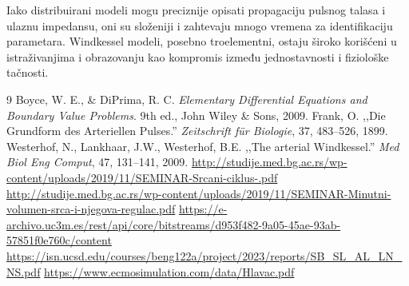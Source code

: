 \documentclass[12pt,a4paper]{article}
\begin{document}
Iako distribuirani modeli mogu preciznije opisati propagaciju pulsnog talasa i ulaznu impedansu, oni su složeniji i zahtevaju mnogo vremena za identifikaciju parametara. Windkessel modeli, posebno troelementni, ostaju široko korišćeni u istraživanjima i obrazovanju kao kompromis između jednostavnosti i fiziološke tačnosti.

\begin{thebibliography}{9}
 Boyce, W. E., \& DiPrima, R. C. \textit{Elementary Differential Equations and Boundary Value Problems}. 9th ed., John Wiley \& Sons, 2009.
 Frank, O. ,,Die Grundform des Arteriellen Pulses.'' \textit{Zeitschrift für Biologie}, 37, 483--526, 1899.
 Westerhof, N., Lankhaar, J.W., Westerhof, B.E. ,,The arterial Windkessel.'' \textit{Med Biol Eng Comput}, 47, 131--141, 2009.
 \url{http://studije.med.bg.ac.rs/wp-content/uploads/2019/11/SEMINAR-Srcani-ciklus-.pdf}
 \url{http://studije.med.bg.ac.rs/wp-content/uploads/2019/11/SEMINAR-Minutni-volumen-srca-i-njegova-regulac.pdf}
 \url{https://e-archivo.uc3m.es/rest/api/core/bitstreams/d953f482-9a05-45ae-93ab-57851f0e760c/content}
 \url{https://isn.ucsd.edu/courses/beng122a/project/2023/reports/SB_SL_AL_LN_NS.pdf}
 \url{https://www.ecmosimulation.com/data/Hlavac.pdf}
\end{thebibliography}
\end{document}
